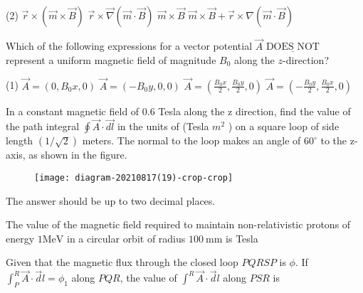 \begin{enumerate}
\begin{minipage}{\textwidth}
\end{minipage}
\begin{tasks}(2)
	\task[\textbf{A.}] $\vec{r} \times(\vec{m} \times \vec{B})$
	\task[\textbf{B.}]$\vec{r} \times \vec{\nabla}(\vec{m} \cdot \vec{B})$
	\task[\textbf{C.}]$\vec{m} \times \vec{B}$
	\task[\textbf{D.}]$\vec{m} \times \vec{B}+\vec{r} \times \nabla(\vec{m} \cdot \vec{B})$
\end{tasks}
\begin{minipage}{\textwidth}
	\item Which of the following expressions for a vector potential $\vec{A} \underline{\text { DOES NOT }}$ represent a uniform magnetic field of magnitude $B_{0}$ along the $z$-direction?
\end{minipage}
\begin{tasks}(1)
	\task[\textbf{A.}] $\vec{A}=\left(0, B_{0} x, 0\right)$
	\task[\textbf{B.}]$\vec{A}=\left(-B_{0} y, 0,0\right)$
	\task[\textbf{C.}]$\vec{A}=\left(\frac{B_{0} x}{2}, \frac{B_{0} y}{2}, 0\right)$
	\task[\textbf{D.}] $\vec{A}=\left(-\frac{B_{0} y}{2}, \frac{B_{0} x}{2}, 0\right)$
\end{tasks}
\begin{minipage}{\textwidth}
	\item In a constant magnetic field of $0.6$ Tesla along the $\mathrm{z}$ direction, find the value of the path integral $\oint \vec{A} \cdot \overrightarrow{d l}$ in the units of (Tesla $m^{2}$ ) on a square loop of side length $(1 / \sqrt{2})$ meters. The normal to the loop makes an angle of $60^{\circ}$ to the z-axis, as shown in the figure.\\
	\begin{figure}[H]
		\centering
		\texttt{[image: diagram-20210817(19)-crop-crop]}
	\end{figure}	
	The answer should be up to two decimal places.
\end{minipage}
\begin{minipage}{\textwidth}
	\item The value of the magnetic field required to maintain non-relativistic protons of energy $1 \mathrm{MeV}$ in a circular orbit of radius $100 \mathrm{~mm}$ is Tesla
\end{minipage}
\begin{minipage}{\textwidth}
	\item Given that the magnetic flux through the closed loop $P Q R S P$ is $\phi$. If $\int_{P}^{R} \vec{A} \cdot \vec{d} l=\phi_{1}$ along $P Q R$, the value of $\int^{R} \vec{A} \cdot \vec{d} l$ along $P S R$ is

\end{minipage}
\end{enumerate}
